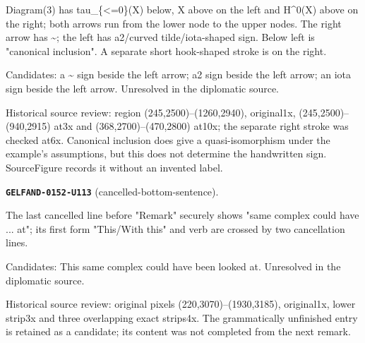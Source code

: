 Diagram(3) has tau\_\{<=0\}(X) below, X above on the left and H\textasciicircum{}0(X) above on the right; both arrows run from the lower node to the upper nodes. The right arrow has \textasciitilde{}; the left has a2/curved tilde/iota-shaped sign. Below left is "canonical inclusion". A separate short hook-shaped stroke is on the right.\par
Candidates: a \textasciitilde{} sign beside the left arrow; a2 sign beside the left arrow; an iota sign beside the left arrow. Unresolved in the diplomatic source.\par
Historical source review: region (245,2500)–(1260,2940), original1x, (245,2500)–(940,2915) at3x and (368,2700)–(470,2800) at10x; the separate right stroke was checked at6x. Canonical inclusion does give a quasi-isomorphism under the example's assumptions, but this does not determine the handwritten sign. SourceFigure records it without an invented label.\par\medskip
\par\noindent\leavevmode{}\label{GELFAND-0152-U113}\textbf{\texttt{GELFAND-0152-U113}} (cancelled-bottom-sentence).\nopagebreak[4]\par
The last cancelled line before "Remark" securely shows "same complex could have ... at"; its first form "This/With this" and verb are crossed by two cancellation lines.\par
Candidates: This same complex could have been looked at. Unresolved in the diplomatic source.\par
Historical source review: original pixels (220,3070)–(1930,3185), original1x, lower strip3x and three overlapping exact strips4x. The grammatically unfinished entry is retained as a candidate; its content was not completed from the next remark.\par\medskip
